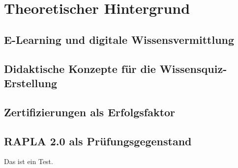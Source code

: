 \chapter{Theoretischer Hintergrund}
\section{E-Learning und digitale Wissensvermittlung}
\section{Didaktische Konzepte für die Wissensquiz-Erstellung}
\section{Zertifizierungen als Erfolgsfaktor}
\section{RAPLA 2.0 als Prüfungsgegenstand}


Das ist ein Test.